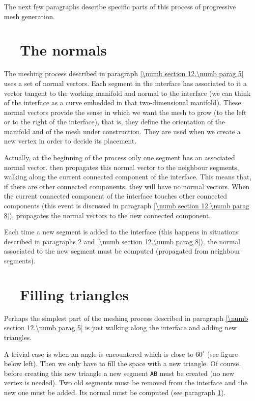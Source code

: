 The next few paragraphs describe specific parts of this process of progressive mesh generation.


\section{~~The normals}\label{\numb section 12.\numb parag 6}

The meshing process described in paragraph \ref{\numb section 12.\numb parag 5} uses a set of
normal vectors.
Each segment in the interface has associated to it
a vector tangent to the working manifold and normal to the interface (we can
think of the interface as a curve embedded in that two-dimensional manifold).
These normal vectors provide the sense in which we want the mesh to grow (to the left or to
the right of the interface), that is, they define the orientation of the manifold and of
the mesh under construction.
They are used when we create a new vertex in order to decide its placement.

Actually, at the beginning of the process only one segment has an associated normal vector.
{\ManiFEM} then propagates this normal vector to the neighbour segments, walking along
the current connected component of the interface.
This means that, if there are other connected components, they will have no normal vectors.
When the current connected component of the interface touches other connected components
(this event is discussed in paragraph \ref{\numb section 12.\numb parag 8}), {\maniFEM}
propagates the normal vectors to the new connected component.

Each time a new segment is added to the interface (this happens in situations described in
paragraphs \ref{\numb section 12.\numb parag 7} and \ref{\numb section 12.\numb parag 8}),
the normal associated to the new segment must be computed (propagated from neighbour
segments).


\section{~~Filling triangles}\label{\numb section 12.\numb parag 7}

Perhaps the simplest part of the meshing process described in paragraph
\ref{\numb section 12.\numb parag 5} is just walking along the interface and
adding new triangles.

A trivial case is when an angle is encountered which is close to $ 60^\circ $
(see figure below left).
Then we only have to fill the space with a new triangle.
Of course, before creating this new triangle a new segment {\small\tt AB} must be created
(no new vertex is needed).
Two old segments must be removed from the interface and the new one must be added.
Its normal must be computed (see paragraph \ref{\numb section 12.\numb parag 6}).


